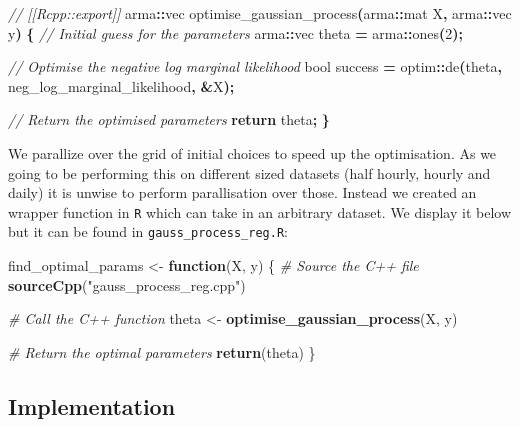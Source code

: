 \documentclass[
]{article}
\newenvironment{Shaded}{\begin{snugshade}}{\end{snugshade}}
\newcommand{\CommentTok}[1]{\textcolor[rgb]{0.56,0.35,0.01}{\textit{#1}}}
\newcommand{\ControlFlowTok}[1]{\textcolor[rgb]{0.13,0.29,0.53}{\textbf{#1}}}
\newcommand{\DataTypeTok}[1]{\textcolor[rgb]{0.13,0.29,0.53}{#1}}
\newcommand{\DecValTok}[1]{\textcolor[rgb]{0.00,0.00,0.81}{#1}}
\newcommand{\FunctionTok}[1]{\textcolor[rgb]{0.13,0.29,0.53}{\textbf{#1}}}
\newcommand{\NormalTok}[1]{#1}
\newcommand{\OperatorTok}[1]{\textcolor[rgb]{0.81,0.36,0.00}{\textbf{#1}}}
\newcommand{\OtherTok}[1]{\textcolor[rgb]{0.56,0.35,0.01}{#1}}
\newcommand{\StringTok}[1]{\textcolor[rgb]{0.31,0.60,0.02}{#1}}
\begin{document}
\begin{Shaded}
\begin{Highlighting}[]
\CommentTok{// [[Rcpp::export]]}
\NormalTok{arma}\OperatorTok{::}\NormalTok{vec optimise\_gaussian\_process}\OperatorTok{(}\NormalTok{arma}\OperatorTok{::}\NormalTok{mat X}\OperatorTok{,}\NormalTok{ arma}\OperatorTok{::}\NormalTok{vec y}\OperatorTok{)} \OperatorTok{\{}
    \CommentTok{// Initial guess for the parameters}
\NormalTok{    arma}\OperatorTok{::}\NormalTok{vec theta }\OperatorTok{=}\NormalTok{ arma}\OperatorTok{::}\NormalTok{ones}\OperatorTok{(}\DecValTok{2}\OperatorTok{);}

    \CommentTok{// Optimise the negative log marginal likelihood}
    \DataTypeTok{bool}\NormalTok{ success }\OperatorTok{=}\NormalTok{ optim}\OperatorTok{::}\NormalTok{de}\OperatorTok{(}\NormalTok{theta}\OperatorTok{,}\NormalTok{ neg\_log\_marginal\_likelihood}\OperatorTok{,} \OperatorTok{\&}\NormalTok{X}\OperatorTok{);}

    \CommentTok{// Return the optimised parameters}
    \ControlFlowTok{return}\NormalTok{ theta}\OperatorTok{;}
\OperatorTok{\}}
\end{Highlighting}
\end{Shaded}

We parallize over the grid of initial choices to speed up the
optimisation. As we going to be performing this on different sized
datasets (half hourly, hourly and daily) it is unwise to perform
parallisation over those. Instead we created an wrapper function in
\texttt{R} which can take in an arbitrary dataset. We display it below
but it can be found in \texttt{gauss\_process\_reg.R}:

\begin{Shaded}
\begin{Highlighting}[]
\NormalTok{find\_optimal\_params }\OtherTok{\textless{}{-}} \ControlFlowTok{function}\NormalTok{(X, y) \{}
  \CommentTok{\# Source the C++ file}
  \FunctionTok{sourceCpp}\NormalTok{(}\StringTok{"gauss\_process\_reg.cpp"}\NormalTok{)}
  
  \CommentTok{\# Call the C++ function}
\NormalTok{  theta }\OtherTok{\textless{}{-}} \FunctionTok{optimise\_gaussian\_process}\NormalTok{(X, y)}
  
  \CommentTok{\# Return the optimal parameters}
  \FunctionTok{return}\NormalTok{(theta)}
\NormalTok{\}}
\end{Highlighting}
\end{Shaded}

\hypertarget{implementation-1}{%
\subsection{Implementation}\label{implementation-1}}
\end{document}
